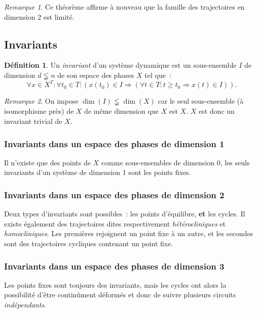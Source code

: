 \documentclass{article}
\theoremstyle{definition}
\newtheorem{déf}[thm]{Définition}
\theoremstyle{remark}
\newtheorem*{rmq}{Remarque}
\begin{document}
	\begin{rmq} Ce théorème affirme à nouveau que la famille des trajectoires en dimension 2 est limité.
	\end{rmq}

	\subsection{Invariants}

	\begin{déf} Un \textit{invariant} d'un système dynamique est un sous-ensemble $I$ de dimension $d \lneqq n$ de son espace des phases $X$ tel que~:
	\[\forall x \in X^T : \forall t_0 \in T : \left(x(t_0) \in I \Rightarrow \left(\forall t \in T : t \geq t_0 \Rightarrow x(t) \in I\right)\right).\]
	\end{déf}

	\begin{rmq} On impose $\dim(I) \lneqq \dim(X)$ car le seul sous-ensemble (à isomorphisme près) de $X$ de même dimension que $X$ est $X$. $X$ est
	donc un invariant trivial de $X$.
	\end{rmq}

		\subsubsection{Invariants dans un espace des phases de dimension 1}

	Il n'existe que des points de $X$ comme sous-ensembles de dimension 0, les seuls invariants d'un système de dimension 1 sont les points fixes.

		\subsubsection{Invariants dans un espace des phases de dimension 2}

	Deux types d'invariants sont possibles~: les points d'équilibre, \textbf{et} les cycles. Il existe également des trajectoires dites respectivement
	\textit{hétérocliniques} et \textit{homocliniques}. Les premières rejoignent un point fixe à un autre, et les secondes sont des trajectoires cycliques
	contenant un point fixe.

		\subsubsection{Invariants dans un espace des phases de dimension 3}

	Les points fixes sont toujours des invariants, mais les cycles ont alors la possibilité d'être continûment déformés et donc de suivre plusieurs circuits
	\textit{indépendants}.
\end{document}
